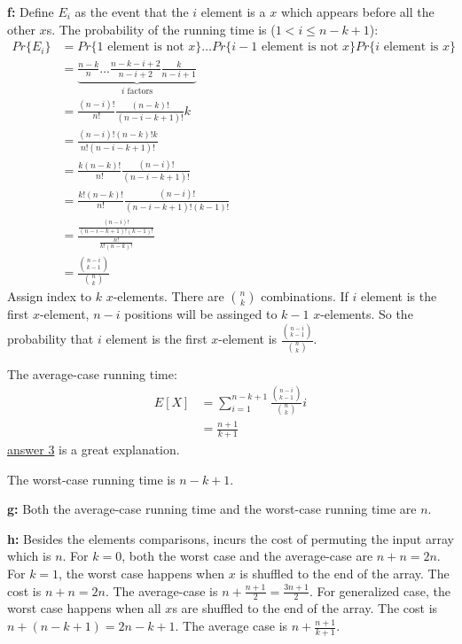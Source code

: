 \documentclass{book}
\begin{document}
\begin{CJK}{UTF8}{gkai}
\textbf{f:}
Define $E_i$ as the event that the $i$ element is a $x$ which appears before all 
the other $x$s.
The probability of the running time is ($1 < i \le n -k +1$):
\begin{align*}
Pr\{E_i\} & = Pr\{\text{$1$ element is not $x$}\} \dots Pr\{\text{$i-1$ element 
is not $x$}\} Pr\{\text{$i$ element is $x$}\} \\
& = \underbrace{\frac{n-k}{n} \dots \frac{n-k-i+2}{n-i+2} 
\frac{k}{n-i+1}}_\text{$i$ factors} \\
& = \frac{(n-i)!}{n!} \frac{(n-k)!}{(n-i-k+1)!} k \\
& = \frac{(n-i)!(n-k)!k}{n!(n-i-k+1)!} \\
& = \frac{k(n-k)!}{n!}\frac{(n-i)!}{(n-i-k+1)!} \\
& = \frac{k!(n-k)!}{n!}\frac{(n-i)!}{(n-i-k+1)!(k-1)!} \\
& = \frac{\frac{(n-i)!}{(n-i-k+1)!(k-1)!}}{\frac{n!}{k!(n-k)!}} \\
& = \frac{\binom{n-i}{k-1}}{\binom{n}{k}}
\end{align*}
Assign index to $k$ $x$-elements. There are $\binom{n}{k}$ combinations. If $i$ 
element is the first $x$-element, $n-i$ positions will be assinged to $k-1$ 
$x$-elements. So the probability that $i$ element is the first $x$-element is 
$\frac{\binom{n-i}{k-1}}{\binom{n}{k}}$.


The average-case running time:
\begin{align*}
E[X] & =\sum_{i=1}^{n-k+1}\frac{\binom{n-i}{k-1}}{\binom{n}{k}}i \\
& = \frac{n+1}{k+1}
\end{align*}
\href{http://stackoverflow.com/questions/5125525/average-case-running-time-of-linear-search-algorithm}{answer 
3} is a great explanation.

The worst-case running time is $n-k+1$.

\textbf{g:} Both the average-case running time and the worst-case running time are $n$.

\textbf{h:} Besides the elements comparisons,  incurs the 
cost of permuting the input array which is $n$. For $k=0$, both the worst case 
and the average-case are $n+n=2n$. For $k=1$, the worst case happens when $x$ is 
shuffled to the end of the array. The cost is $n+n=2n$. The average-case is 
$n+\frac{n+1}{2} = \frac{3n+1}{2}$. For generalized case, the worst case happens 
when all $x$s are shuffled to the end of the array. The cost is 
$n+(n-k+1)=2n-k+1$.  The average case is $n+\frac{n+1}{k+1}$.


\end{CJK}
\end{document}
